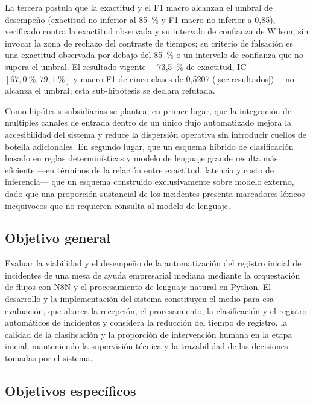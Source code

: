 La tercera postula que la exactitud y el F1 macro alcanzan el umbral de desempeño (exactitud no inferior al 85~\% y F1 macro no inferior a 0,85), verificado contra la exactitud observada y su intervalo de confianza de Wilson, sin invocar la zona de rechazo del contraste de tiempos; su criterio de falsación es una exactitud observada por debajo del 85~\% o un intervalo de confianza que no supera el umbral. El resultado vigente ---73,5~\% de exactitud, IC \([67{,}0~\%, 79{,}1~\%]\) y macro-F1 de cinco clases de 0,5207 (\autoref{sec:resultados})--- no alcanza el umbral; esta sub-hipótesis se declara refutada.

Como hipótesis subsidiarias se plantea, en primer lugar, que la integración de multiples canales de entrada dentro de un único flujo automatizado mejora la accesibilidad del sistema y reduce la dispersión operativa sin introducir cuellos de botella adicionales. En segundo lugar, que un esquema híbrido de clasificación basado en reglas determinísticas y modelo de lenguaje grande resulta más eficiente ---en términos de la relación entre exactitud, latencia y costo de inferencia--- que un esquema construido exclusivamente sobre modelo externo, dado que una proporción sustancial de los incidentes presenta marcadores léxicos inequivocos que no requieren consulta al modelo de lenguaje.

\subsection{Objetivo general}\label{subsec:objetivo-general}

Evaluar la viabilidad y el desempeño de la automatización del registro inicial de incidentes de una mesa de ayuda empresarial mediana mediante la orquestación de flujos con N8N y el procesamiento de lenguaje natural en Python. El desarrollo y la implementación del sistema constituyen el medio para esa evaluación, que abarca la recepción, el procesamiento, la clasificación y el registro automáticos de incidentes y considera la reducción del tiempo de registro, la calidad de la clasificación y la proporción de intervención humana en la etapa inicial, manteniendo la supervisión técnica y la trazabilidad de las decisiones tomadas por el sistema.

\subsection{Objetivos específicos}\label{subsec:objetivos-especificos}

